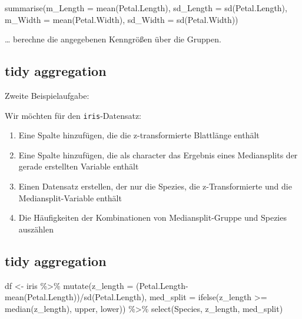 \documentclass[
]{book}
\newenvironment{Shaded}{\begin{snugshade}}{\end{snugshade}}
\newcommand{\AttributeTok}[1]{\textcolor[rgb]{0.77,0.63,0.00}{#1}}
\newcommand{\FunctionTok}[1]{\textcolor[rgb]{0.00,0.00,0.00}{#1}}
\newcommand{\NormalTok}[1]{#1}
\newcommand{\OtherTok}[1]{\textcolor[rgb]{0.56,0.35,0.01}{#1}}
\newcommand{\SpecialCharTok}[1]{\textcolor[rgb]{0.00,0.00,0.00}{#1}}
\newcommand{\StringTok}[1]{\textcolor[rgb]{0.31,0.60,0.02}{#1}}
\begin{document}
\begin{Shaded}
\begin{Highlighting}[]
  \FunctionTok{summarise}\NormalTok{(}\AttributeTok{m\_Length =} \FunctionTok{mean}\NormalTok{(Petal.Length),}
            \AttributeTok{sd\_Length =} \FunctionTok{sd}\NormalTok{(Petal.Length),}
            \AttributeTok{m\_Width =} \FunctionTok{mean}\NormalTok{(Petal.Width), }
            \AttributeTok{sd\_Width =} \FunctionTok{sd}\NormalTok{(Petal.Width))}
\end{Highlighting}
\end{Shaded}

\ldots{} berechne die angegebenen Kenngrößen über die Gruppen.

\hypertarget{tidy-aggregation-2}{%
\subsection{tidy aggregation}\label{tidy-aggregation-2}}

Zweite Beispielaufgabe:

Wir möchten für den \texttt{iris}-Datensatz:

\begin{enumerate}
\def\labelenumi{\arabic{enumi}.}
\item
  Eine Spalte hinzufügen, die die z-transformierte Blattlänge enthält
\item
  Eine Spalte hinzufügen, die als character das Ergebnis eines Mediansplits der gerade erstellten Variable enthält
\item
  Einen Datensatz erstellen, der nur die Spezies, die z-Transformierte und die Mediansplit-Variable enthält
\item
  Die Häufigkeiten der Kombinationen von Mediansplit-Gruppe und Spezies auszählen
\end{enumerate}

\hypertarget{tidy-aggregation-3}{%
\subsection{tidy aggregation}\label{tidy-aggregation-3}}

\begin{Shaded}
\begin{Highlighting}[]
\NormalTok{df }\OtherTok{\textless{}{-}}\NormalTok{ iris }\SpecialCharTok{\%\textgreater{}\%} 
  \FunctionTok{mutate}\NormalTok{(}\AttributeTok{z\_length =}\NormalTok{ (Petal.Length}\SpecialCharTok{{-}}\FunctionTok{mean}\NormalTok{(Petal.Length))}\SpecialCharTok{/}\FunctionTok{sd}\NormalTok{(Petal.Length),}
        \AttributeTok{med\_split =} \FunctionTok{ifelse}\NormalTok{(z\_length }\SpecialCharTok{\textgreater{}=} \FunctionTok{median}\NormalTok{(z\_length),}
                            \StringTok{\textquotesingle{}upper\textquotesingle{}}\NormalTok{,}
                            \StringTok{\textquotesingle{}lower\textquotesingle{}}\NormalTok{)) }\SpecialCharTok{\%\textgreater{}\%} 
  \FunctionTok{select}\NormalTok{(Species, z\_length, med\_split) }
\end{Highlighting}
\end{Shaded}
\end{document}
